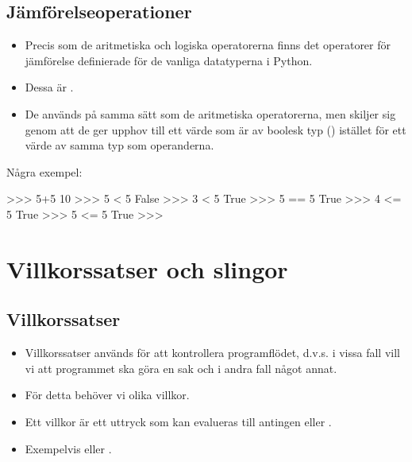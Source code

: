 \documentclass{beamer}
\begin{document}
\subsection{Jämförelseoperationer}

\begin{frame}{\insertsubsectionhead}
  \begin{itemize}
    \item Precis som de aritmetiska och logiska operatorerna finns det 
      operatorer för jämförelse definierade för de vanliga datatyperna 
      i Python.

    \item Dessa är \code{== < > <= >= !=}.

    \item De används på samma sätt som de aritmetiska operatorerna, men skiljer 
      sig genom att de ger upphov till ett värde som är av boolesk typ 
      () istället för ett värde av samma typ som operanderna.

  \end{itemize}
\end{frame}

\begin{frame}[fragile]{\insertsubsectionhead}
  Några exempel:
  \begin{terminal}
>>> 5+5
10
>>> 5 < 5
False
>>> 3 < 5
True
>>> 5 == 5
True
>>> 4 <= 5
True
>>> 5 <= 5
True
>>>
  \end{terminal}
\end{frame}


\section{Villkorssatser och slingor}

\subsection{Villkorssatser}

\begin{frame}{\insertsubsectionhead}
  \begin{itemize}
    \item Villkorssatser används för att kontrollera programflödet, d.v.s.  
      i vissa fall vill vi att programmet ska göra en sak och i andra fall 
      något annat.

    \item För detta behöver vi olika villkor.

    \item Ett villkor är ett uttryck som kan evalueras till antingen 
       eller .

    \item Exempelvis  eller .

  \end{itemize}
\end{frame}
\end{document}
